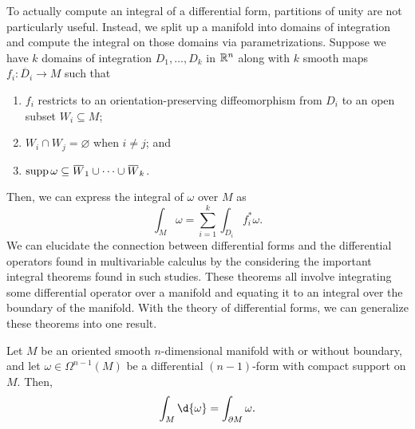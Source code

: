 \documentclass[a4paper,12pt]{article}
\begin{document}
To actually compute an integral of a differential form, partitions of unity are not particularly useful.
Instead, we split up a manifold into domains of integration and compute the integral on those domains via parametrizations.
Suppose we have $k$ domains of integration $D_1, \ldots, D_k$ in $\mathbb{R}^n$ along with $k$ smooth maps $f_i \colon \overbar{D}_i \to M$ such that
\begin{enumerate}
    \item $f_i$ restricts to an orientation-preserving diffeomorphism from $D_i$ to an open subset $W_i \subseteq M$;
    \item $W_i \cap W_j = \varnothing$ when $i \neq j$; and
    \item $\supp \omega \subseteq \overbar{W}_1 \cup \cdots \cup \overbar{W}_k$.
\end{enumerate}
Then, we can express the integral of $\omega$ over $M$ as
\begin{equation}
    \int_M \omega = \sum_{i=1}^k \int_{D_i} f^*_i \omega.
\end{equation}
We can elucidate the connection between differential forms and the differential operators found in multivariable calculus by the considering the important integral theorems found in such studies.
These theorems all involve integrating some differential operator over a manifold and equating it to an integral over the boundary of the manifold.
With the theory of differential forms, we can generalize these theorems into one result.
\begin{theorem}\label{thm:stokes'_theorem}
    Let $M$ be an oriented smooth $n$-dimensional manifold with or without boundary, and let $\omega \in \Omega^{n-1}(M)$ be a differential $(n-1)$-form with compact support on $M$.
    Then,
    \begin{equation}\label{eq:stokes'_theorem}
        \int_M \d{\omega} = \int_{\partial M} \omega.
    \end{equation}
\end{theorem}
\end{document}
